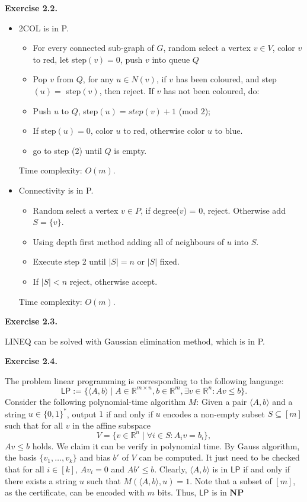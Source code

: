 \documentclass[a4paper]{article}
\newenvironment{exercise}[1]{
	\par
	\noindent\textbf{Exercise #1.}\quad
}{
	\par
	\bigskip
}
\begin{document}
\begin{exercise}{2.2}
		\begin{itemize}
			\item 2COL is in P. %
			\begin{itemize}
				\item For every connected sub-graph of $G$, random select a vertex $v\in V$, color $v$ to red, let step$(v) = 0$, push $v$ into queue $Q$\;
				\item \quad Pop $v$ from $Q$, for any $u \in N(v)$, if $v$ has been coloured, and step$(u)=$ step$(v)$, then reject. If $v$ has not been coloured, do:
				\item \quad \quad Push $u$ to $Q$, step$(u)=step(v) + 1$ (mod $2$);
				\item \quad \quad If step$(u)=0$, color $u$ to red, otherwise color $u$ to blue.
				\item \quad go to step (2) until $Q$ is empty.
			\end{itemize}
			Time complexity: $O(m)$.
			\item Connectivity is in P.
			\begin{itemize}
				\item Random select a vertex $v\in P$, if degree($v$) = 0, reject. Otherwise add $S = \{v\}$.
				\item Using depth first method adding all of neighbours of $u$ into $S$.
				\item Execute step 2 until $|S| = n$ or $|S|$ fixed.
				\item If $|S|< n$ reject, otherwise accept.
			\end{itemize}
			Time complexity: $O(m)$.
		\end{itemize}
	\end{exercise}

	\begin{exercise}{2.3}
	    LINEQ can be solved with Gaussian elimination method, which is in P.
	\end{exercise}

	\begin{exercise}{2.4}
		The problem linear programming is corresponding to the following language:
		\[
			\mathsf{LP} := \{\langle A,b \rangle \mid A \in \mathbb{R}^{m\times n}, b \in \mathbb{R}^m, \exists v \in \mathbb{R}^n: Av \leq b\}.
		\]
		Consider the following polynomial-time algorithm $M$: Given a pair $\langle A,b \rangle$ and a string $u \in \{0,1\}^*$, output $1$ if and only if $u$ encodes a non-empty subset $S \subseteq [m]$ such that for all $v$ in the affine subspace
		\[
			V = \{v \in \mathbb{R}^n \mid \forall i \in S: A_i v = b_i\},
		\]
		$Av \leq b$ holds. We claim it can be verify in polynomial time. By Gauss algorithm, the basis $\{v_1,\ldots,v_k\}$ and bias $b'$ of $V$ can be computed. It just need to be checked that for all $i\in [k]$, $A v_i = 0$ and $Ab' \leq b$. Clearly, $\langle A,b \rangle$ is in $\mathsf{LP}$ if and only if there exists a string $u$ such that $M(\langle A,b \rangle, u) = 1$. Note that a subset of $[m]$, as the certificate, can be encoded with $m$ bits. Thus, $\mathsf{LP}$ is in $\mathbf{NP}$
	\end{exercise}
\end{document}
